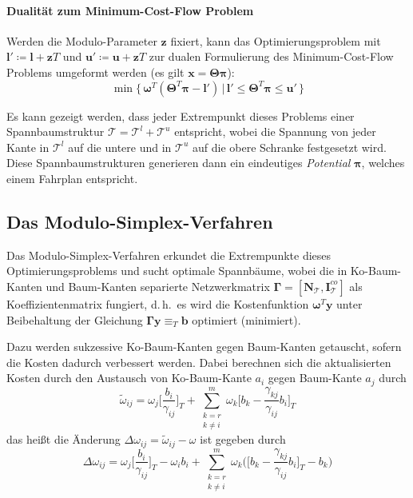 \documentclass[a4paper, 10pt, twocolumn]{scrartcl}
\newcommand{\mat}[1]{\boldsymbol{#1}}
\renewcommand{\vec}[1]{\boldsymbol{#1}}
\renewcommand{\dh}{d.\,h.~}
\begin{document}
		\paragraph{Dualität zum Minimum-Cost-Flow Problem}
			Werden die Modulo-Parameter \( \vec{z} \) fixiert, kann das Optimierungsproblem mit \( \vec{l}' \coloneqq \vec{l} + \vec{z}T \) und \( \vec{u}' \coloneqq \vec{u} + \vec{z}T \) zur dualen Formulierung des Minimum-Cost-Flow Problems umgeformt werden (es gilt \( \vec{x} = \mat{\Theta} \vec{\pi} \)):
			\begin{equation*}
				\min \big\{\, \vec{\omega}^T (\mat{\Theta}^T \vec{\pi} - \vec{l}') \,\vert\, \vec{l}' \leq \mat{\Theta}^T \vec{\pi} \leq \vec{u}' \,\big\}
			\end{equation*}
			
			Es kann gezeigt werden, dass jeder Extrempunkt dieses Problems einer Spannbaumstruktur \( \mathcal{T} = \mathcal{T}^l + \mathcal{T}^u \) entspricht, wobei die Spannung von jeder Kante in \( \mathcal{T}^l \) auf die untere und in \( \mathcal{T}^u \) auf die obere Schranke festgesetzt wird. Diese Spannbaumstrukturen generieren dann ein eindeutiges \emph{Potential}  \(\vec{\pi}\), welches einem Fahrplan entspricht.
	
	\subsection*{Das Modulo-Simplex-Verfahren}
		Das Modulo-Simplex-Verfahren erkundet die Extrempunkte dieses Optimierungsproblems und sucht optimale Spannbäume, wobei die in Ko-Baum-Kanten und Baum-Kanten separierte Netzwerkmatrix \( \mat{\Gamma} = [\mat{N}_\mathcal{T}, \mat{I}_\mathcal{T}^\mathit{co}] \) als Koeffizientenmatrix fungiert, \dh es wird die Kostenfunktion \( \vec{\omega}^T \vec{y} \) unter Beibehaltung der Gleichung \( \mat{\Gamma} \vec{y} \equiv_T \vec{b} \) optimiert (minimiert).
		
		Dazu werden sukzessive Ko-Baum-Kanten gegen Baum-Kanten getauscht, sofern die Kosten dadurch verbessert werden. Dabei berechnen sich die aktualisierten Kosten durch den Austausch von Ko-Baum-Kante \( a_i \) gegen Baum-Kante \( a_j \) durch
		\begin{equation*}
			\tilde{\omega}_{ij} = \omega_j \bigg[ \frac{b_i}{\gamma_{ij}} \bigg]_T \! + \sum_{\substack{k = r \\ k \neq i}}^{m} \omega_k \bigg[ b_k - \frac{\gamma_{kj}}{\gamma_{ij}} b_i \bigg]_T
		\end{equation*}
		das heißt die Änderung \( \Delta\omega_{ij} = \tilde{\omega}_{ij} - \omega \) ist gegeben durch
		\begin{equation*}
			\Delta\omega_{ij} = \omega_j \bigg[ \frac{b_i}{\gamma_{ij}} \bigg]_T \! - \omega_i b_i + \sum_{\substack{k = r \\ k \neq i}}^{m} \omega_k \Bigg( \bigg[ b_k - \frac{\gamma_{kj}}{\gamma_{ij}} b_i \bigg]_T - b_k \Bigg)
		\end{equation*}
	
\end{document}

